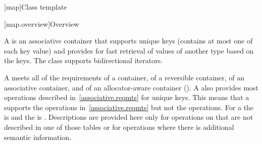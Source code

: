 [map]{Class template }

[map.overview]{Overview}

%
\pnum
A  is an associative container that
supports unique keys (contains at most one of each key value) and
provides for fast retrieval of values of another type  based
on the keys. The  class supports bidirectional iterators.

\pnum
A
meets all of the requirements of a container, of a reversible container, of
an associative container, and of an allocator-aware container ().
A
also provides most operations described in~\ref{associative.reqmts}
for unique keys.
This means that a
supports the
operations in~\ref{associative.reqmts}
but not the
operations.
For a
the
is
and the
is
.
Descriptions are provided here only for operations on
that are not described in one of those tables
or for operations where there is additional semantic information.

